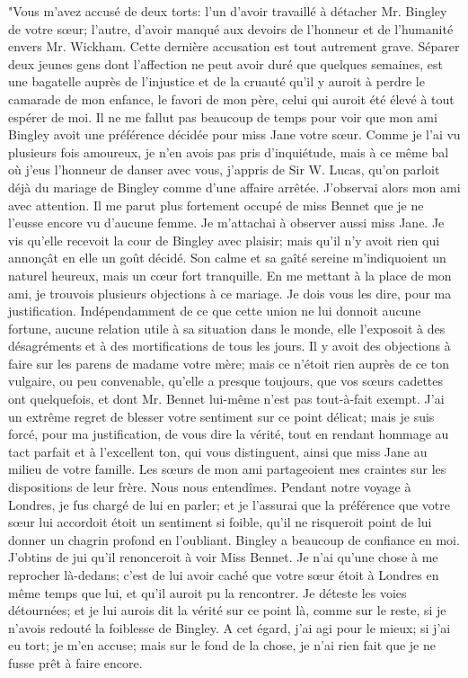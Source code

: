 "Vous m'avez accusé de deux torts: l'un\setcounter{page}{92} d'avoir travaillé à détacher Mr. Bingley de votre sœur; l'autre, d'avoir manqué aux devoirs de l'honneur et de l'humanité envers Mr. Wickham. Cette dernière accusation est tout autrement grave. Séparer deux jeunes gens dont l'affection ne peut avoir duré que quelques semaines, est une bagatelle auprès de l'injustice et de la cruauté qu'il y auroit à perdre le camarade de mon enfance, le favori de mon père, celui qui auroit été élevé à tout espérer de moi. Il ne me fallut pas beaucoup de temps pour voir que mon ami Bingley avoit une préférence décidée pour miss Jane votre sœur. Comme je l'ai vu plusieurs fois amoureux, je n'en avois pas pris d'inquiétude, mais à ce même bal où j'eus l'honneur de danser avec vous, j'appris de Sir W. Lucas, qu'on parloit déjà du mariage de Bingley comme d'une affaire arrêtée. J'observai alors mon ami avec attention. Il me parut plus fortement occupé de miss Bennet que je ne l'eusse encore vu d'aucune femme. Je m'attachai à observer aussi miss Jane. Je vis qu'elle recevoit la cour de Bingley avec plaisir; mais qu'il n'y avoit rien qui annonçât en elle un goût décidé. Son calme et sa gaîté sereine m'indiquoient un naturel heureux, mais un cœur fort tranquille. En me\setcounter{page}{93} mettant à la place de mon ami, je trouvois plusieurs objections à ce mariage. Je dois vous les dire, pour ma justification. Indépendamment de ce que cette union ne lui donnoit aucune fortune, aucune relation utile à sa situation dans le monde, elle l'exposoit à des désagréments et à des mortifications de tous les jours. Il y avoit des objections à faire sur les parens de madame votre mère; mais ce n'étoit rien auprès de ce ton vulgaire, ou peu convenable, qu'elle a presque toujours, que vos sœurs cadettes ont quelquefois, et dont Mr. Bennet lui-même n'est pas tout-à-fait exempt. J'ai un extrême regret de blesser votre sentiment sur ce point délicat; mais je suis forcé, pour ma justification, de vous dire la vérité, tout en rendant hommage au tact parfait et à l'excellent ton, qui vous distinguent, ainsi que miss Jane au milieu de votre famille. Les sœurs de mon ami partageoient mes craintes sur les dispositions de leur frère. Nous nous entendîmes. Pendant notre voyage à Londres, je fus chargé de lui en parler; et je l'assurai que la préférence que votre sœur lui accordoit étoit un sentiment si foible, qu'il ne risqueroit point de lui donner un chagrin profond en l'oubliant. Bingley a beaucoup de confiance en moi. J'obtins de\setcounter{page}{94} jui qu'il renonceroit à voir Miss Bennet. Je n'ai qu'une chose à me reprocher là-dedans; c'est de lui avoir caché que votre sœur étoit à Londres en même temps que lui, et qu'il auroit pu la rencontrer. Je déteste les voies détournées; et je lui aurois dit la vérité sur ce point là, comme sur le reste, si je n'avois redouté la foiblesse de Bingley. A cet égard, j'ai agi pour le mieux; si j'ai eu tort; je m'en accuse; mais sur le fond de la chose, je n'ai rien fait que je ne fusse prêt à faire encore.

